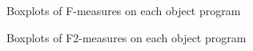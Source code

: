 \documentclass[10pt,journal,compsoc]{IEEEtran}
\begin{document}
\begin{figure}[tp]
	\centering
	\caption{Boxplots of F-measures on each object program}
	\label{fig:Fmeasure}
\end{figure}

\begin{figure}[tp]
	\centering
	\caption{Boxplots of F2-measures on each object program}
	\label{fig:F2measure}
\end{figure}
\end{document}
